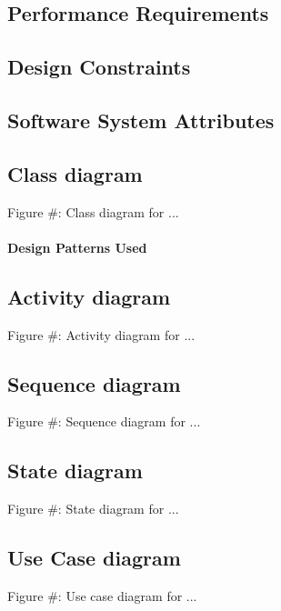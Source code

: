 \subsection{Performance Requirements}
\begin{itemize}
	
\end{itemize}
\subsection{Design Constraints}
\begin{enumerate}
	
\end{enumerate}
\subsection{Software System Attributes}



\subsection{Class diagram}
	\begin{center}
	    \small{Figure #: Class diagram for ...}
    \end{center}
\paragraph{Design Patterns Used}
	
	
		
\subsection{Activity diagram}
	\begin{center}
	    \small{Figure #: Activity diagram for ...}
    \end{center}


\subsection{Sequence diagram}
	\begin{center}
	    \small{Figure #: Sequence diagram for ...}
    \end{center}

\subsection{State diagram}
	\begin{center}
	    \small{Figure #: State diagram for ...}
    \end{center}




\subsection{Use Case diagram}
    \begin{center}
    	\small{Figure #: Use case diagram for ...}
    \end{center}